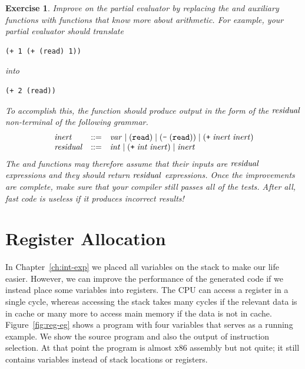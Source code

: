 \documentclass[11pt]{book}
\newtheorem{exercise}[theorem]{Exercise}
\begin{document}
\begin{exercise}
\normalfont

Improve on the partial evaluator by replacing the  and
 auxiliary functions with functions that know more about
arithmetic. For example, your partial evaluator should translate
\begin{lstlisting}
(+ 1 (+ (read) 1))
\end{lstlisting}
into
\begin{lstlisting}
(+ 2 (read))
\end{lstlisting}
To accomplish this, the  function should produce output
in the form of the $\mathit{residual}$ non-terminal of the following
grammar.
\[
\begin{array}{lcl}
\mathit{inert} &::=& \mathit{var} \mid (\texttt{read}) \mid (\texttt{-} \;(\texttt{read}))
      \mid (\texttt{+} \; \mathit{inert} \; \mathit{inert})\\
\mathit{residual} &::=& \mathit{int} \mid (\texttt{+}\; \mathit{int}\; \mathit{inert}) \mid \mathit{inert}
\end{array}
\]
The  and  functions may therefore assume
that their inputs are $\mathit{residual}$ expressions and they should
return $\mathit{residual}$ expressions.  Once the improvements are
complete, make sure that your compiler still passes all of the tests.
After all, fast code is useless if it produces incorrect results!
\end{exercise}



\chapter{Register Allocation}
\label{ch:register-allocation-r1}


In Chapter~\ref{ch:int-exp} we placed all variables on the stack to
make our life easier. However, we can improve the performance of the
generated code if we instead place some variables into registers.  The
CPU can access a register in a single cycle, whereas accessing the
stack takes many cycles if the relevant data is in cache or many more
to access main memory if the data is not in cache.
Figure~\ref{fig:reg-eg} shows a program with four variables that
serves as a running example. We show the source program and also the
output of instruction selection. At that point the program is almost
x86 assembly but not quite; it still contains variables instead of
stack locations or registers.
\end{document}
